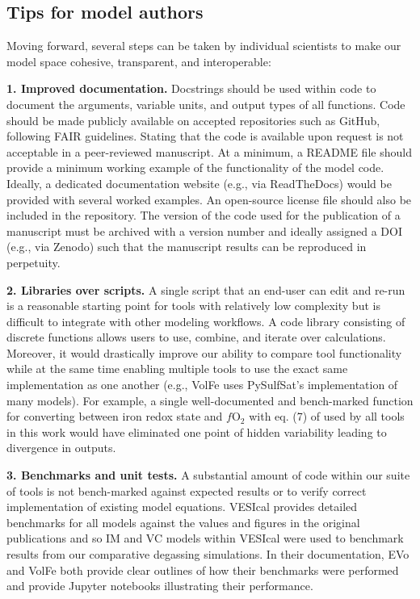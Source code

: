 \documentclass[draft, english]{volcanica-template}
\begin{document}
\subsection{Tips for model authors}
Moving forward, several steps can be taken by individual scientists to make our model space cohesive, transparent, and interoperable:

\textbf{1. Improved documentation.} Docstrings should be used within code to document the arguments, variable units, and output types of all functions. Code should be made publicly available on accepted repositories such as GitHub, following FAIR \parencite{wilkinson2016FAIR} guidelines. Stating that the code is available upon request is not acceptable in a peer-reviewed manuscript. At a minimum, a README file should provide a minimum working example of the functionality of the model code. Ideally, a dedicated documentation website (e.g., via ReadTheDocs) would be provided with several worked examples. An open-source license file should also be included in the repository. The version of the code used for the publication of a manuscript must be archived with a version number and ideally assigned a DOI (e.g., via Zenodo) such that the manuscript results can be reproduced in perpetuity.

\textbf{2. Libraries over scripts.} A single script that an end-user can edit and re-run is a reasonable starting point for tools with relatively low complexity but is difficult to integrate with other modeling workflows. A code library consisting of discrete functions allows users to use, combine, and iterate over calculations. Moreover, it would drastically improve our ability to compare tool functionality while at the same time enabling multiple tools to use the exact same implementation as one another (e.g., VolFe uses PySulfSat's implementation of many models). For example, a single well-documented and bench-marked function for converting between iron redox state and $f$O$_2$ with eq. (7) of \textcite{Kress1991} used by all tools in this work would have eliminated one point of hidden variability leading to divergence in outputs.

\textbf{3. Benchmarks and unit tests.} A substantial amount of code within our suite of tools is not bench-marked against expected results or to verify correct implementation of existing model equations. VESIcal provides detailed benchmarks for all models against the values and figures in the original publications and so IM and VC models within VESIcal were used to benchmark results from our comparative degassing simulations. In their documentation, EVo and VolFe both provide clear outlines of how their benchmarks were performed and provide Jupyter notebooks illustrating their performance.
\end{document}
